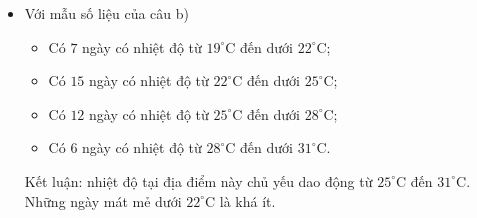 \begin{ex}
{\begin{itemize}
\begin{itemize}
				\item Có $5$ sinh viên chi dưới $50$ nghìn đồng cho việc thanh toán cước điện  thoại trong tháng;
				\item Có $12$ sinh viên  chi từ $50$ đến dưới $100$ nghìn đồng cho việc thanh toán cước điện thoại trong tháng;
				\item Có $23$ sinh viên chỉ từ $100$ đến dưới  $150$ nghìn đồng cho việc thanh toán cước điện thoại trong tháng;
				\item Có $17$ sinh viên chỉ từ $150$ đến dưới $200$ nghìn đồng cho việc thanh toán cước điện thoại trong tháng; 
				\item Có $3$  sinh viên chi từ $200$ đến dưới $250$ nghìn đồng cho việc thanh toán cước điện thoại trong tháng.
			\end{itemize}
			Kết luận: đa số sinh viên chi từ $100$ đến dưới $150$ nghìn  đồng mỗi tháng cho cước điện thoại và có ít sinh viên chi trên $200$ nghìn đồng cho cước điện thoại mỗi tháng.
			\item Với mẫu số  liệu của câu b)
			\begin{itemize}
				\item Có $7$ ngày có nhiệt  độ từ $19^\circ \text{C}$ đến dưới $22^\circ \text{C}$;
				\item Có $15$ ngày có nhiệt độ từ $22^\circ \text{C}$  đến dưới $25^\circ \text{C}$;
				\item Có $12$ ngày có nhiệt độ từ $25^\circ  \text{C}$ đến dưới $28^\circ \text{C}$;
				 \item Có $6$ ngày có nhiệt độ từ $28^\circ \text{C}$ đến dưới $31^\circ \text{C}$.
			\end{itemize}
			Kết luận: nhiệt  độ tại địa điểm này chủ yếu dao động từ $25^\circ\text{C}$ đến $31^\circ\text{C}$. Những ngày mát mẻ dưới $22^\circ\text{C}$ là khá ít.
		\end{itemize}
	} 
\end{ex}

